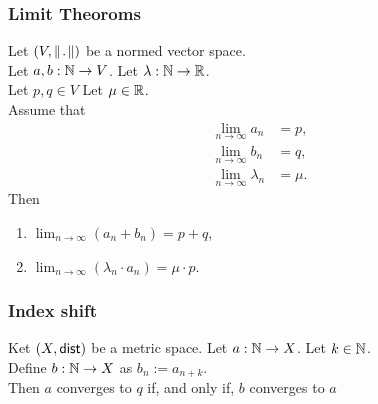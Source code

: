 \subsubsection*{Limit Theoroms}
Let $(V, \norm)$ be a normed vector space.\\
Let $a,b : \mathbb{N} \to V$. Let $\lambda : \mathbb{N} \to \mathbb{R}$.\\
Let $p,q \in V$ Let $\mu \in \mathbb{R}$.\\
Assume that
\begin{align*}
    \lim_{n \to \infty} a_n &= p,\\
    \lim_{n \to \infty} b_n &= q,\\
    \lim_{n \to \infty} \lambda_n &= \mu.
\end{align*}
Then
\begin{enumerate}
    \item $\lim_{n \to \infty} (a_n + b_n) = p + q$,
    \item $\lim_{n \to \infty} (\lambda_n \cdot a_n) = \mu \cdot p$.
\end{enumerate}


\subsubsection*{Index shift}
Ket $(X, \mathsf{dist})$ be a metric space. Let $a : \mathbb{N} \to X$. Let $k \in \mathbb{N}$.\\
Define $b : \mathbb{N} \to X$ as $b_n := a_{n+k}$.\\
Then $a$ converges to $q$ if, and only if, $b$ converges to $a$